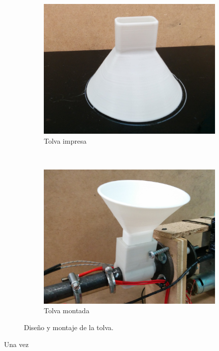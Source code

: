 \begin{figure}[H]
    \centering
    \begin{subfigure}[b]{0.5\textwidth}
        \centering
        \includegraphics[width=\linewidth]{images/producciones/20072015/IMG_20150721_121831.jpg}
        \caption{Tolva impresa}
        \label{fig:tolva-impresa}
    \end{subfigure}
    ~
    \begin{subfigure}[b]{0.5\textwidth}
            \centering
        \includegraphics[width=\linewidth]{images/producciones/20072015/IMG_20150721_121904.jpg}
        \caption{Tolva montada}
        \label{fig:tolva-impresa}
    \end{subfigure}
    \caption{Diseño y montaje de la tolva.}
    \label{fig:tolv_montaj}
\end{figure}

Una vez 